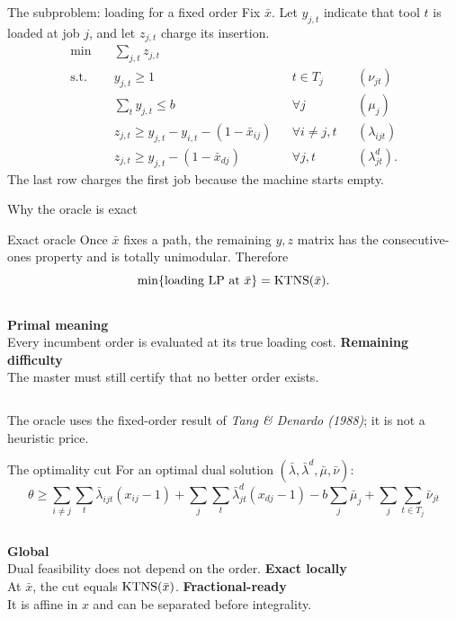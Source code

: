 \begin{frame}{The subproblem: loading for a fixed order}
\vspace{0.05cm}
Fix $\bar x$. Let $y_{j,t}$ indicate that tool $t$ is loaded at job $j$, and let
$z_{j,t}$ charge its insertion.
{\small
\[
\begin{aligned}
\min\quad & \sum_{j,t}z_{j,t}\\
\text{s.t.}\quad
&y_{j,t}\ge1 && t\in T_j &&(\nu_{jt})\\
&\sum_t y_{j,t}\le b && \forall j &&(\mu_j)\\
&z_{j,t}\ge y_{j,t}-y_{i,t}-(1-\bar x_{ij})
&&\forall i\ne j,t &&(\lambda_{ijt})\\
&z_{j,t}\ge y_{j,t}-(1-\bar x_{dj})
&&\forall j,t &&(\lambda^d_{jt}).
\end{aligned}
\]}
The last row charges the first job because the machine starts empty.
\end{frame}

\begin{frame}{Why the oracle is exact}
\vspace{0.35cm}
\begin{block}{Exact oracle}
Once $\bar x$ fixes a path, the remaining $y,z$ matrix has the consecutive-ones
property and is totally unimodular. Therefore
\[
\min\{\text{loading LP at }\bar x\}=\mathrm{KTNS}(\bar x).
\]
\end{block}
\vspace{0.35cm}
\begin{columns}[T,onlytextwidth]
\textbf{Primal meaning}\\[.12cm]
Every incumbent order is evaluated at its true loading cost.
\textbf{Remaining difficulty}\\[.12cm]
The master must still certify that no better order exists.
\end{columns}
\vspace{0.35cm}
\centering\small
The oracle uses the fixed-order result of {\itshape\color{muted}Tang \& Denardo (1988)}; it is not a heuristic price.
\end{frame}

\begin{frame}{The optimality cut}
\vspace{0.13cm}
For an optimal dual solution
$(\bar\lambda,\bar\lambda^d,\bar\mu,\bar\nu)$:
\[
\boxed{
\theta\ge
\sum_{i\ne j}\sum_t\bar\lambda_{ijt}(x_{ij}-1)
+\sum_j\sum_t\bar\lambda^d_{jt}(x_{dj}-1)
-b\sum_j\bar\mu_j
+\sum_j\sum_{t\in T_j}\bar\nu_{jt}}
\]
\vspace{0.24cm}
\begin{columns}[T,onlytextwidth]
\textbf{Global}\\[.1cm]
Dual feasibility does not depend on the order.
\textbf{Exact locally}\\[.1cm]
At $\bar x$, the cut equals $\mathrm{KTNS}(\bar x)$.
\textbf{Fractional-ready}\\[.1cm]
It is affine in $x$ and can be separated before integrality.
\end{columns}
\end{frame}

